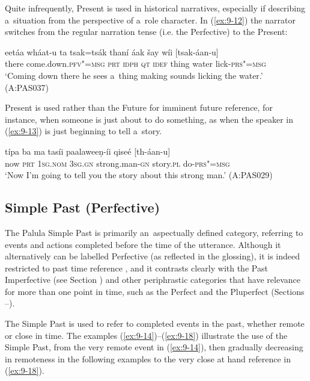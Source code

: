 Quite infrequently, Present is used in historical narratives, especially if describing a~situation from the perspective of a~role character. In (\ref{ex:9-12}) the narrator switches from the regular narration tense (i.e. the Perfective) to the Present:

\begin{exe}
\ex
\label{ex:9-12}
\gll eetáa wháat-u ta tsak=tsák thaní áak šay wíi [tsak-áan-u] \\
there come.down.\textsc{pfv"=msg} \textsc{prt} \textsc{idph} \textsc{qt} \textsc{idef}  thing water lick-\textsc{prs"=msg}\\
\glt `Coming down there he sees a~thing making sounds licking the water.' (A:PAS037)
\end{exe}

Present is used rather than the Future for imminent future reference, for instance, when someone is just about to do something, as when the speaker in (\ref{ex:9-13}) is just beginning to tell a~story.

\begin{exe}
\ex
\label{ex:9-13}
\gll típa ba ma tasíi paalaweeṇ-íi qiseé [th-áan-u] \\
now \textsc{prt} 1\textsc{sg.nom} 3\textsc{sg.gn} strong.man-\textsc{gn} story.\textsc{pl} do-\textsc{prs"=msg} \\
\glt `Now I'm going to tell you the story about this strong man.' (A:PAS029)
\end{exe}

\subsection{Simple Past (Perfective)}
\label{subsec:9-1-4}


The Palula Simple Past is primarily an~aspectually defined category, referring to events and actions completed before the time of the utterance. Although it alternatively can be labelled Perfective (as reflected in the glossing), it is indeed restricted to past time reference \citep[79]{dahl1985}, and it contrasts clearly with the Past Imperfective (see Section ) and other periphrastic categories that have relevance for more than one point in time, such as the Perfect and the Pluperfect (Sections --).



The Simple Past is used to refer to completed events in the past, whether remote or close in time. The examples (\ref{ex:9-14})--(\ref{ex:9-18}) illustrate the use of the Simple Past, from the very remote event in (\ref{ex:9-14}), then gradually decreasing in remoteness in the following examples to the very close at hand reference in (\ref{ex:9-18}).

